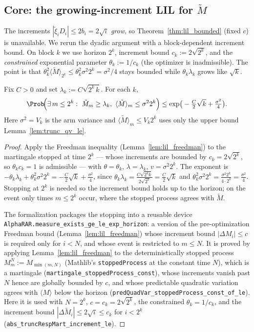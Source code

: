 \subsection{Core: the growing-increment LIL for $\tilde M$}
\label{sec:pre_lil_grow}

The increments $|\tilde\xi_i D_i|\le 2b_i=2\sqrt i$ \emph{grow}, so Theorem~\ref{thm:lil_bounded}
(fixed $c$) is unavailable. We rerun the dyadic argument with a block-dependent increment bound.
On block $k$ we use horizon $2^k$, increment bound $c_k:=2\sqrt{2^k}$, and the \emph{constrained}
exponential parameter $\theta_k:=1/c_k$ (the optimizer is inadmissible). The point is that
$\theta_k^2\langle\tilde M\rangle_{2^k}\le\theta_k^2\sigma^2 2^k=\sigma^2/4$ stays bounded while
$\theta_k\lambda_k$ grows like $\sqrt k$.

\begin{lemma}\label{lem:trunc_block}
Fix $C>0$ and set $\lambda_k:=C\sqrt{2^k\,k}$. For each $k$,
\[
  \Prob\!\Big(\exists\,m\le 2^k:\ \tilde M_m\ge\lambda_k,\ \langle\tilde M\rangle_m\le\sigma^2 2^k\Big)
  \le \exp\!\big(-\tfrac{C}{2}\sqrt k+\tfrac{\sigma^2}{4}\big).
\]
Here $\sigma^2=V_k$ is the arm variance and $\langle\tilde M\rangle_m\le V_k 2^k$ uses only the
upper bound Lemma~\ref{lem:trunc_qv_le}.
\end{lemma}
\begin{proof}
Apply the Freedman inequality (Lemma~\ref{lem:lil_freedman}) to the martingale stopped at time
$2^k$ --- whose increments are bounded by $c_k=2\sqrt{2^k}$, so $\theta_k c_k=1$ is admissible ---
with $\theta=\theta_k$, $\lambda=\lambda_k$, $v=\sigma^2 2^k$. The exponent is
$-\theta_k\lambda_k+\theta_k^2\sigma^2 2^k=-\tfrac C2\sqrt k+\tfrac{\sigma^2}4$, since
$\theta_k\lambda_k=\tfrac{C\sqrt{2^k k}}{2\sqrt{2^k}}=\tfrac C2\sqrt k$ and
$\theta_k^2\sigma^2 2^k=\tfrac{\sigma^2 2^k}{4\cdot2^k}=\tfrac{\sigma^2}4$. Stopping at $2^k$ is
needed so the increment bound holds up to the horizon; on the event only times $m\le 2^k$ occur,
where the stopped process agrees with $\tilde M$.

The formalization packages the stopping into a reusable device
\texttt{AlphaRAR.measure\_exists\_ge\_le\_exp\_horizon}: a version of the pre-optimization Freedman
bound (Lemma~\ref{lem:lil_freedman}) whose increment bound $|\Delta M_i|\le c$ is required only for
$i<N$, and whose event is restricted to $m\le N$. It is proved by applying
Lemma~\ref{lem:lil_freedman} to the deterministically stopped process
$M^N_m:=M_{\min(m,N)}$ (Mathlib's \texttt{stoppedProcess} at the constant time $N$), which is a martingale
(\texttt{martingale\_stoppedProcess\_const}), whose increments vanish past $N$ hence are globally bounded by
$c$, and whose predictable quadratic variation agrees with $\langle M\rangle$ below the horizon
(\texttt{predQuadVar\_stoppedProcess\_const\_of\_le}). Here it is used with $N=2^k$, $c=c_k=2\sqrt{2^k}$, the
constrained $\theta_k=1/c_k$, and the increment bound $|\Delta\tilde M_i|\le2\sqrt i\le c_k$ for
$i<2^k$ (\texttt{abs\_truncRespMart\_increment\_le}).
\end{proof}

